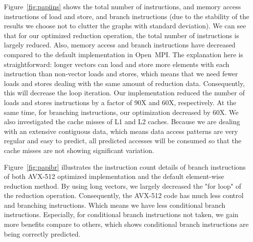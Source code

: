 \documentclass[5p,times,twocolumn]{elsarticle}
\newcommand{\ompi}[0]{Open~MPI\xspace}
\begin{document}
Figure~\ref{fig:papiins} shows the total number of instructions, and memory access instructions of
load and store, and branch instructions (due to the
stability of the results we choose not to clutter the graphs with
standard deviation).
We can see that for our optimized reduction operation, the total number of
instructions is largely reduced. Also, memory access and branch instructions
have decreased compared to the default implementation in \ompi.
The explanation here is straightforward: longer vectors can load and store more
elements with each instruction than non-vector loads and stores, which means that
we need fewer loads and stores dealing with the same amount of reduction data.
Consequently, this will decrease the loop iteration.
%
Our implementation reduced the number of loads and stores instructions
by a factor of 90X and 60X, respectively.  At the same time, for
branching instructions, our optimization decreased by 60X.  We also
investigated the cache misses of L1 and L2 caches. Because we are
dealing with an extensive contiguous data, which means data access
patterns are very regular and easy to predict, all predicted accesses
will be consumed so that the cache misses are not showing significant
variation.

Figure~\ref{fig:papibr} illustrates the instruction count details
of branch instructions of both AVX-512 optimized implementation and the default
element-wise reduction method. By using long vectors, we largely decreased the "for loop" of the reduction
operation. Consequently, the AVX-512 code has much less control and branching instructions.
Which means we have less conditional branch instructions.
Especially, for conditional branch instructions not taken, we gain
more benefits compare to others, which shows conditional branch instructions are being correctly predicted.

\end{document}
